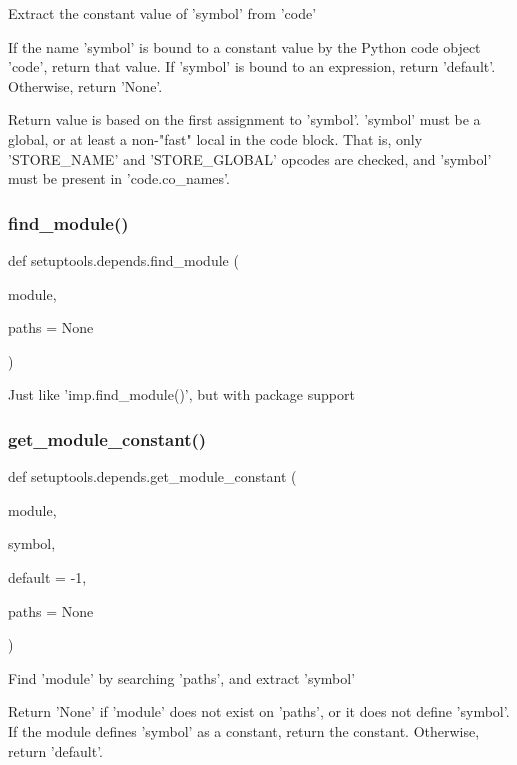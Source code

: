 \begin{DoxyVerb}Extract the constant value of 'symbol' from 'code'

If the name 'symbol' is bound to a constant value by the Python code
object 'code', return that value.  If 'symbol' is bound to an expression,
return 'default'.  Otherwise, return 'None'.

Return value is based on the first assignment to 'symbol'.  'symbol' must
be a global, or at least a non-"fast" local in the code block.  That is,
only 'STORE_NAME' and 'STORE_GLOBAL' opcodes are checked, and 'symbol'
must be present in 'code.co_names'.
\end{DoxyVerb}
 \mbox{\label{namespacesetuptools_1_1depends_a4a94ecfdec67b2f432eed142f7cafaf5}} 
\subsubsection{\texorpdfstring{find\+\_\+module()}{find\_module()}}
{\footnotesize\ttfamily def setuptools.\+depends.\+find\+\_\+module (\begin{DoxyParamCaption}\item[{}]{module,  }\item[{}]{paths = {\ttfamily None} }\end{DoxyParamCaption})}

\begin{DoxyVerb}Just like 'imp.find_module()', but with package support\end{DoxyVerb}
 \mbox{\label{namespacesetuptools_1_1depends_a5a13c841cb5ec0ec368eb437b3e7c615}} 
\subsubsection{\texorpdfstring{get\+\_\+module\+\_\+constant()}{get\_module\_constant()}}
{\footnotesize\ttfamily def setuptools.\+depends.\+get\+\_\+module\+\_\+constant (\begin{DoxyParamCaption}\item[{}]{module,  }\item[{}]{symbol,  }\item[{}]{default = {\ttfamily -\/1},  }\item[{}]{paths = {\ttfamily None} }\end{DoxyParamCaption})}

\begin{DoxyVerb}Find 'module' by searching 'paths', and extract 'symbol'

Return 'None' if 'module' does not exist on 'paths', or it does not define
'symbol'.  If the module defines 'symbol' as a constant, return the
constant.  Otherwise, return 'default'.\end{DoxyVerb}
 